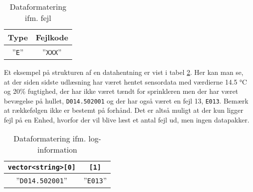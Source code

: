 \begin{table}[h]
	\caption{Dataformatering ifm. fejl}
	\centering
	\begin{tabular}{|c|c|}
		\hline 
		\textbf{Type} & \textbf{Fejlkode} \\ 
		\hline 
		''\verb+E+'' & ''\verb+XXX+'' \\ 
		\hline 
	\end{tabular} 
	\label{table:SWDataprotokol-error}
\end{table}

Et eksempel på strukturen af en datahentning er vist i tabel \ref{table:SWDataprotokol-eksempel}. Her kan man se, at der siden sidste udlæsning har været hentet sensordata med værdierne 14.5 °C og 20\% fugtighed, der har ikke været tændt for sprinkleren men der har været bevægelse på hullet, \verb+D014.502001+ og der har også været en fejl 13, \verb+E013+. Bemærk at rækkefølgen ikke er bestemt på forhånd. Det er altså muligt at der kun ligger fejl på en Enhed, hvorfor der vil blive læst et antal fejl ud, men ingen datapakker.


\begin{table}[h]
	\caption{Dataformatering ifm. log-information}
	\centering
	\begin{tabular}{|c|c|}
		\hline
		\verb+vector<string>[0]+ & \verb+[1]+ \\
		\hline 
		''\verb+D014.502001+'' & ''\verb+E013+'' \\ 
		\hline 
	\end{tabular} 
	\label{table:SWDataprotokol-eksempel}
\end{table}